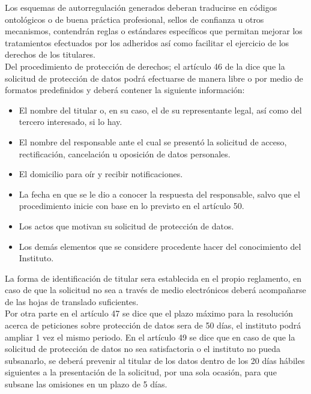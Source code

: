 \documentclass[runningheads,a4paper]{llncs}
\begin{document}
Los esquemas de autorregulación generados deberan traducirse en códigos ontológicos o de buena práctica
profesional, sellos de confianza u otros mecanismos, contendrán reglas o estándares específicos que
permitan mejorar los tratamientos efectuados por los adheridos así como facilitar el ejercicio de los
derechos de los titulares.\\

Del procedimiento de protección de derechos; el artículo 46 de la \cite{LFPDPPP_1} dice que la solicitud de protección de datos podrá efectuarse de manera libre o por medio de formatos predefinidos y deberá contener la siguiente información:

\begin{itemize}
	\item El nombre del titular o, en su caso, el de su representante legal, así como del tercero interesado,
si lo hay.
	\item El nombre del responsable ante el cual se presentó la solicitud de acceso, rectificación,
cancelación u oposición de datos personales.
	\item El domicilio para oír y recibir notificaciones.
	\item La fecha en que se le dio a conocer la respuesta del responsable, salvo que el procedimiento
inicie con base en lo previsto en el artículo 50.
	\item Los actos que motivan su solicitud de protección de datos.
	\item Los demás elementos que se considere procedente hacer del conocimiento del Instituto.
\end{itemize} 

La forma de identificación de titular sera establecida en el propio reglamento, en caso de que la solicitud no sea a través de medio electrónicos deberá acompañarse de las hojas de translado suficientes.\\

Por otra parte en el artículo 47 se dice que el plazo máximo para la resolución acerca de peticiones sobre protección de datos sera de 50 días, el instituto podrá ampliar 1 vez el mismo periodo. En el artículo 49 se dice que en caso de que la solicitud de protección de datos no sea satisfactoria o el instituto no pueda subsanarlo, se deberá prevenir al titular de los datos dentro de los 20 días hábiles siguientes a la presentación de la solicitud, por una sola ocasión, para que subsane las omisiones en un plazo de 5 días.\\
\end{document}
